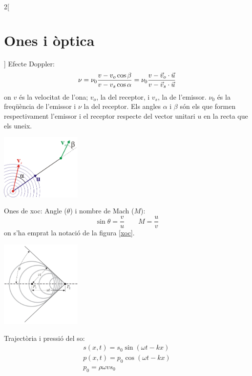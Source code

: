 \documentclass[../../../main.tex]{subfiles}
\begin{document}
\begin{multicols}{2}[\section{Ones i òptica}]
Efecte Doppler:
\begin{equation*}
    \nu=\nu_0\frac{v-v_o\cos\beta}{v- v_s\cos\alpha}=\nu_0\frac{v-\Vec{v}_o\cdot\Vec{u}}{v- \Vec{v}_s\cdot\Vec{u}}\\
\end{equation*}
{\footnotesize on $v$ és la velocitat de l'ona; $v_o$, la del receptor, i $v_s$, la de l'emissor. $\nu_0$ és la freqüència de l'emissor i $\nu$ la del receptor. Els angles $\alpha$ i $\beta$ són els que formen respectivament l'emissor i el receptor respecte del vector unitari $u$ en la recta que els uneix.}\newline
\begin{minipage}{\linewidth}
   \centering
   \includegraphics[width=4cm]{Physics/1st/Waves_and_optics/Images/dopp.png}
   \label{dopp}
\end{minipage}
Ones de xoc:
Angle ($\theta$) i nombre de Mach ($M$): $$\sin\theta=\frac{v}{u}\qquad M=\frac{u}{v}$$ {\footnotesize on s'ha emprat la notació de la figura \ref{xoc}.}\newline
\begin{minipage}{\linewidth}
   \centering
   \includegraphics[width=4cm]{Physics/1st/Waves_and_optics/Images/onesdexoc.jpg}
   \label{xoc}
\end{minipage}
Trajectòria i pressió del so:
\begin{gather*}
    s(x,t)=s_0\sin\left(\omega t-kx\right)\\
    p(x,t)=p_0\cos\left(\omega t-kx\right)\\
    p_0=\rho\omega vs_0

\end{gather*}
\end{multicols}
\end{document}
